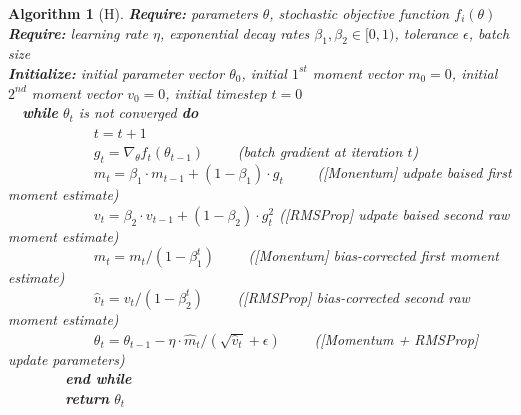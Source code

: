 \documentclass[letterpaper,11 pt]{article}
\newtheorem{algorithm}{Algorithm}
\begin{document}
\allowdisplaybreaks

\begin{algorithm}[H]
\caption{The ADAM algorithm computes a batch stochastic gradient to compute momentum and RMSProp vectors at each timestep, with a bias correction step accounting for first and second moment estimates. Model parameters are updated using this recursive gradient information.}
\label{alg:adam}

{\bf Require:}  parameters $\theta$, stochastic objective function $f_{i}(\theta)$ \\
{\bf Require:} learning rate $\eta$, exponential decay rates $\beta_1, \beta_2 \in [0,1)$, tolerance $\epsilon$, batch size \\
{\bf Initialize:} initial parameter vector $\theta_{0}$, initial $1^{st}$ moment vector $m_0 = 0$, initial $2^{nd}$ moment vector $v_0 = 0$, initial timestep $t = 0$ \\
\-\ \-\ {\bf while} $\theta_t$ is not converged {\bf do} \\
\-\ \-\ \-\ \-\ \-\ \-\ \-\ \-\ \-\ \-\ \-\ \-\   $t = t+1$ \\
\-\ \-\ \-\ \-\ \-\ \-\ \-\ \-\ \-\ \-\ \-\ \-\   $g_{t} = \nabla_{\theta} f_{t} (\theta_{t-1}) $ \-\ \-\ \-\ \-\  (\textit{batch gradient at iteration $t$}) \\
\-\ \-\ \-\ \-\ \-\ \-\ \-\ \-\ \-\ \-\ \-\ \-\   $m_{t} = \beta_{1} \cdot m_{t-1} + (1 - \beta_{1}) \cdot g_{t}$ \-\ \-\ \-\ \-\  (\textit{[Monentum] udpate baised first moment estimate}) \\
\-\ \-\ \-\ \-\ \-\ \-\ \-\ \-\ \-\ \-\ \-\ \-\   $v_{t} = \beta_{2} \cdot v_{t-1} + (1 - \beta_{2}) \cdot g_{t}^{2}$ (\textit{[RMSProp] udpate baised second raw moment estimate})  \\
\-\ \-\ \-\ \-\ \-\ \-\ \-\ \-\ \-\ \-\ \-\ \-\    $\hat{m}_{t} = m_{t} / (1 - \beta_{1}^t) $ \-\ \-\ \-\ \-\  (\textit{[Monentum]  bias-corrected first moment estimate}) \\
\-\ \-\ \-\ \-\ \-\ \-\ \-\ \-\ \-\ \-\ \-\ \-\    $\hat{v}_{t} = v_{t} / (1 - \beta_{2}^t) $ \-\ \-\ \-\ \-\  (\textit{[RMSProp] bias-corrected second raw moment estimate})  \\
\-\ \-\ \-\ \-\ \-\ \-\ \-\ \-\ \-\ \-\ \-\ \-\   $\theta_{t} = \theta_{t-1} - \eta \cdot \hat{m}_{t} / ( \sqrt{\hat{v}_{t}} + \epsilon ) $ \-\ \-\ \-\ \-\  (\textit{[Momentum + RMSProp] update parameters}) \\
\-\ \-\ \-\ \-\ \-\ \-\ \-\ \-\  {\bf end while} \\
\-\ \-\ \-\ \-\ \-\ \-\ \-\ \-\  {\bf return} $\theta_{t}$ \\

\end{algorithm}
\end{document}
